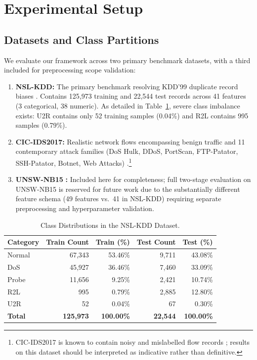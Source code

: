\documentclass[journal]{IEEEtran}
\begin{document}
\section{Experimental Setup}
\label{sec:experimental_setup}

\subsection{Datasets and Class Partitions}
We evaluate our framework across two primary benchmark datasets, with a third included for preprocessing scope validation:
\begin{enumerate}
    \item \textbf{NSL-KDD:} The primary benchmark resolving KDD'99 duplicate record biases \cite{tavallaee2009detailed}. Contains 125,973 training and 22,544 test records across 41 features (3 categorical, 38 numeric). As detailed in Table~\ref{tab:class_dist}, severe class imbalance exists: U2R contains only 52 training samples (0.04\%) and R2L contains 995 samples (0.79\%).
    \item \textbf{CIC-IDS2017:} Realistic network flows encompassing benign traffic and 11 contemporary attack families (DoS Hulk, DDoS, PortScan, FTP-Patator, SSH-Patator, Botnet, Web Attacks) \cite{sharafaldin2018toward}.\footnote{CIC-IDS2017 is known to contain noisy and mislabelled flow records \cite{engelen2021troubleshooting}; results on this dataset should be interpreted as indicative rather than definitive.}
    \item \textbf{UNSW-NB15} \cite{moustafa2015unsw}\textbf{:} Included here for completeness; full two-stage evaluation on UNSW-NB15 is reserved for future work due to the substantially different feature schema (49 features vs.\ 41 in NSL-KDD) requiring separate preprocessing and hyperparameter validation.
\end{enumerate}

\begin{table}[t]
\centering
\small
\caption{Class Distributions in the NSL-KDD Dataset.}
\label{tab:class_dist}
\begin{tabular}{lrrrr}
\toprule
\textbf{Category} & \textbf{Train Count} & \textbf{Train (\%)} & \textbf{Test Count} & \textbf{Test (\%)} \\
\midrule
Normal  & 67,343 & 53.46\% & 9,711 & 43.08\% \\
DoS     & 45,927 & 36.46\% & 7,460 & 33.09\% \\
Probe   & 11,656 &  9.25\% & 2,421 & 10.74\% \\
R2L     &    995 &  0.79\% & 2,885 & 12.80\% \\
U2R     &     52 &  0.04\% &    67 &  0.30\% \\
\midrule
\textbf{Total} & \textbf{125,973} & \textbf{100.00\%} & \textbf{22,544} & \textbf{100.00\%} \\
\bottomrule
\end{tabular}
\end{table}
\end{document}
